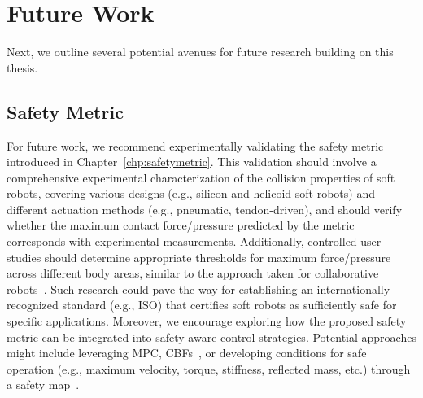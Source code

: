 \section{Future Work}\label{sec:conclusion:future_work}
Next, we outline several potential avenues for future research building on this thesis.

\subsection{Safety Metric}
For future work, we recommend experimentally validating the safety metric introduced in Chapter~\ref{chp:safetymetric}. This validation should involve a comprehensive experimental characterization of the collision properties of soft robots, covering various designs (e.g., silicon and helicoid soft robots) and different actuation methods (e.g., pneumatic, tendon-driven), and should verify whether the maximum contact force/pressure predicted by the metric corresponds with experimental measurements. Additionally, controlled user studies should determine appropriate thresholds for maximum force/pressure across different body areas, similar to the approach taken for collaborative robots~\citep{muttray2014kollaborierende}. Such research could pave the way for establishing an internationally recognized standard (e.g., ISO) that certifies soft robots as sufficiently safe for specific applications. Moreover, we encourage exploring how the proposed safety metric can be integrated into safety-aware control strategies. Potential approaches might include leveraging \gls{MPC}, \glspl{CBF}~\cite{ames2016control}, or developing conditions for safe operation (e.g., maximum velocity, torque, stiffness, reflected mass, etc.) through a safety map~\citep{mansfeld2018safety}.


